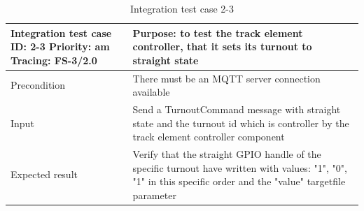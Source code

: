\begin{table}[H]
	\caption{Integration test case 2-3}
	\label{table:TCase-FSI2-3}
	\begin{center}
		\renewcommand{\arraystretch}{1.8}
		\begin{tabu} 
			to 0.9 \textwidth
			{  X[0.4, c] X[c] }
			\toprule
			Integration test case ID: 2-3 \newline Priority: am \newline Tracing: FS-3/2.0 & Purpose: to test the track element controller, that it sets its turnout to straight state                                                                         \\ \midrule
			Precondition                                                                   & There must be an MQTT server connection available                                                                                                                 \\
			Input                                                                          & Send a TurnoutCommand message with straight state and the turnout id which is controller by the track element controller component                                \\
			Expected result                                                                & Verify that the straight GPIO handle of the specific turnout have written with values: "1", "0", "1" in this specific order and the "value" targetfile parameter \\ \bottomrule
		\end{tabu}
	\end{center}
\end{table} 

